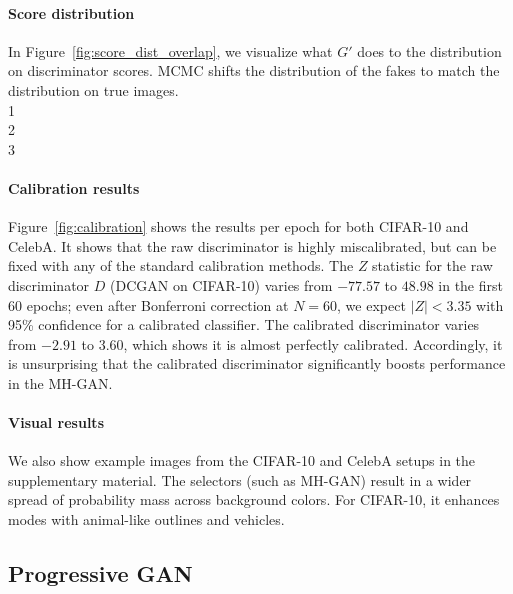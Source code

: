 \documentclass{article}
\begin{document}
\paragraph{Score distribution}
In Figure~\ref{fig:score_dist_overlap}, we visualize what $G'$ does to the distribution on discriminator scores.
MCMC shifts the distribution of the fakes to match the distribution on true images.\\
1\\ %
2\\
3

\paragraph{Calibration results}
Figure~\ref{fig:calibration} shows the results per epoch for both CIFAR-10 and CelebA\@.
It shows that the raw discriminator is highly miscalibrated, but can be fixed with any of the standard calibration methods.
The $Z$ statistic for the raw discriminator $D$ (DCGAN on CIFAR-10) varies from $-77.57$ to $48.98$ in the first 60 epochs; even after Bonferroni correction at $N \!\!=\!\! 60$, we expect $|Z| < 3.35$ with 95\% confidence for a calibrated classifier.
The calibrated discriminator varies from $-2.91$ to $3.60$, which shows it is almost perfectly calibrated.
Accordingly, it is unsurprising that the calibrated discriminator significantly boosts performance in the MH-GAN\@.

\paragraph{Visual results}
We also show example images from the CIFAR-10 and CelebA setups in the supplementary material.
The selectors (such as MH-GAN) result in a wider spread of probability mass across background colors.
For CIFAR-10, it enhances modes with animal-like outlines and vehicles.

\subsection{Progressive GAN}
\end{document}
